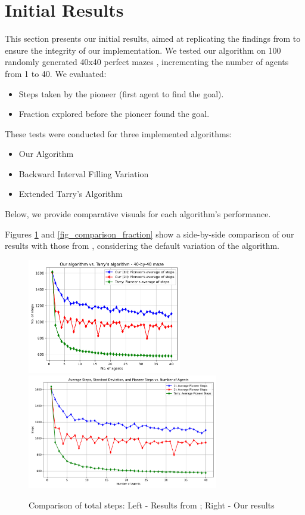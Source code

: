 \section{Initial Results}
\label{section_result_initial_results}

This section presents our initial results,
aimed at replicating the findings from  to ensure the integrity of our implementation.
We tested our algorithm on 100 randomly generated 40x40 perfect mazes \cite{Naeem2021}, incrementing the number of agents from 1 to 40.
We evaluated:

\begin{itemize}
    \item Steps taken by the pioneer (first agent to find the goal).
    \item Fraction explored before the pioneer found the goal.
\end{itemize}

These tests were conducted for three implemented algorithms:

\begin{itemize}
\item Our Algorithm
\item Backward Interval Filling Variation
\item Extended Tarry's Algorithm \cite{Kivelevitch2010}
\end{itemize}

Below, we provide comparative visuals for each algorithm's performance.

Figures \ref{fig_comparison_steps} and \ref{fig_comparison_fraction} show a side-by-side comparison of our results with those from ,
considering the default variation of the algorithm.

\begin{figure}[H]
\centering
\includegraphics[height=5cm]{Cap3/arthur_tarry_40x40_steps.pdf}
\includegraphics[height=5cm]{Cap3/self_steps_40_by_40_tarry.pdf}
\caption{Comparison of total steps: Left - Results from ; Right - Our results}
\label{fig_comparison_steps}
\end{figure}

